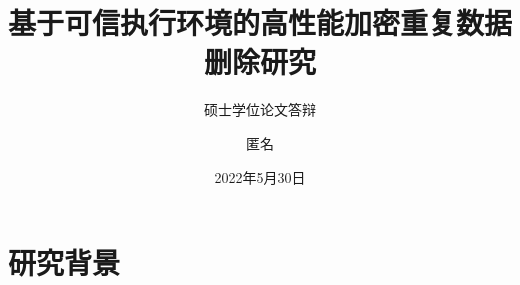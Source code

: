 \documentclass{beamer}
\author{匿名}
\title{基于可信执行环境的高性能加密重复数据删除研究}
\subtitle{硕士学位论文答辩}
\institute{电子科技大学计算机科学与工程学院（网络空间安全学院）}
\date{2022年5月30日}
\begin{document}
\kaishu
\begin{frame}
    \titlepage
\end{frame}



\section{研究背景}

\end{document}
